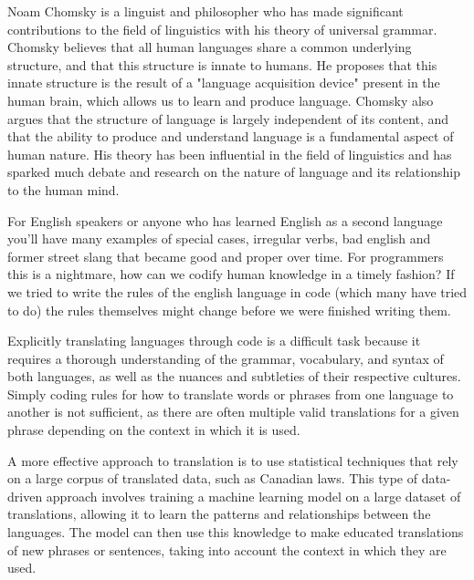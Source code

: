 Noam Chomsky is a linguist and philosopher who has made significant contributions to the field of linguistics with his theory of universal grammar. Chomsky believes that all human languages share a common underlying structure, and that this structure is innate to humans. He proposes that this innate structure is the result of a "language acquisition device" present in the human brain, which allows us to learn and produce language. Chomsky also argues that the structure of language is largely independent of its content, and that the ability to produce and understand language is a fundamental aspect of human nature. His theory has been influential in the field of linguistics and has sparked much debate and research on the nature of language and its relationship to the human mind.

For English speakers or anyone who has learned English as a second language you'll have many examples of special cases, irregular verbs, bad english and former street slang that became good and proper over time. For programmers this is a nightmare, how can we codify human knowledge in a timely fashion? If we tried to write the rules of the english language in code (which many have tried to do) the rules themselves might change before we were finished writing them.

Explicitly translating languages through code is a difficult task because it requires a thorough understanding of the grammar, vocabulary, and syntax of both languages, as well as the nuances and subtleties of their respective cultures. Simply coding rules for how to translate words or phrases from one language to another is not sufficient, as there are often multiple valid translations for a given phrase depending on the context in which it is used.

A more effective approach to translation is to use statistical techniques that rely on a large corpus of translated data, such as Canadian laws. This type of data-driven approach involves training a machine learning model on a large dataset of translations, allowing it to learn the patterns and relationships between the languages. The model can then use this knowledge to make educated translations of new phrases or sentences, taking into account the context in which they are used.

